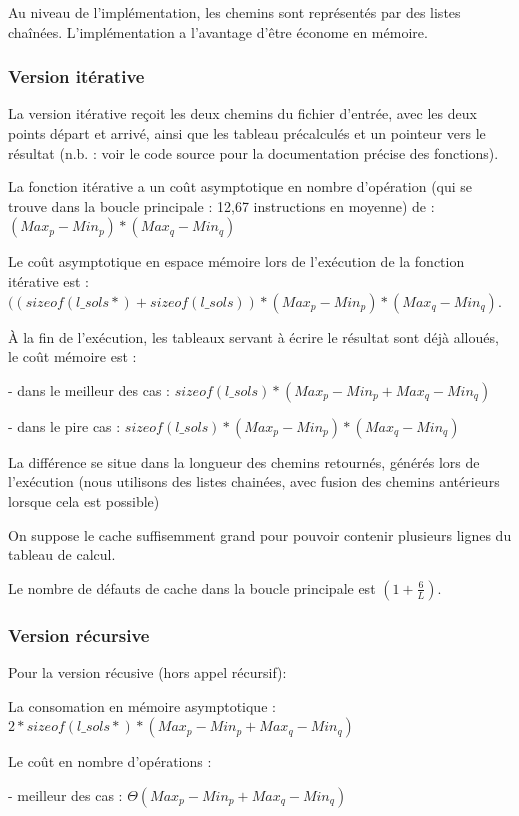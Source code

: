 \documentclass[paper=a4, fontsize=11pt]{scrartcl} %
\begin{document}
Au niveau de l'implémentation, les chemins sont représentés par des listes chaînées.
L'implémentation a l'avantage d'être économe en mémoire.

\subsubsection*{Version itérative}

La version itérative reçoit les deux chemins du fichier d'entrée, avec les deux points départ et arrivé, ainsi que les tableau précalculés et un pointeur vers le résultat (n.b. : voir le code source pour la documentation précise des fonctions).

La fonction itérative a un coût asymptotique en nombre d'opération (qui se trouve dans la boucle principale : 12,67 instructions en moyenne) de : $ (Max_p - Min_p) * (Max_q - Min_q)$

Le coût asymptotique en espace mémoire lors de l'exécution de la fonction itérative est : $ ((sizeof(l\_sols *) + sizeof(l\_sols)) * (Max_p - Min_p) * (Max_q - Min_q) $.

À la fin de l'exécution, les tableaux servant à écrire le résultat sont déjà alloués, le coût mémoire est :

- dans le meilleur des cas : $sizeof(l\_sols) * (Max_p - Min_p + Max_q - Min_q)$

- dans le pire cas : $ sizeof(l\_sols) * (Max_p - Min_p) * (Max_q - Min_q) $

La différence se situe dans la longueur des chemins retournés, générés lors de l'exécution (nous utilisons des listes chainées, avec fusion des chemins antérieurs lorsque cela est possible)

On suppose le cache suffisemment grand pour pouvoir contenir plusieurs lignes du tableau de calcul.

Le nombre de défauts de cache dans la boucle principale est $(1 + \frac{6}{L})$.

\subsubsection*{Version récursive}

Pour la version récusive (hors appel récursif):

La consomation en mémoire asymptotique : $ 2 * sizeof(l\_sols *) * (Max_p - Min_p + Max_q - Min_q) $

Le coût en nombre d'opérations :

- meilleur des cas : $\Theta(Max_p - Min_p + Max_q - Min_q)$
\end{document}
